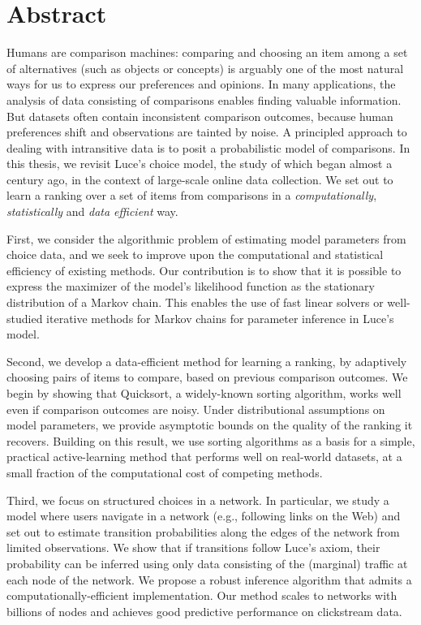 \cleardoublepage
\chapter*{Abstract}

Humans are comparison machines: comparing and choosing an item among a set of alternatives (such as objects or concepts) is arguably one of the most natural ways for us to express our preferences and opinions.
In many applications, the analysis of data consisting of comparisons enables finding valuable information.
But datasets often contain inconsistent comparison outcomes, because human preferences shift and observations are tainted by noise.
A principled approach to dealing with intransitive data is to posit a probabilistic model of comparisons.
In this thesis, we revisit Luce's choice model, the study of which began almost a century ago, in the context of large-scale online data collection.
We set out to learn a ranking over a set of items from comparisons in a \emph{computationally}, \emph{statistically} and \emph{data efficient} way.

First, we consider the algorithmic problem of estimating model parameters from choice data, and we seek to improve upon the computational and statistical efficiency of existing methods.
Our contribution is to show that it is possible to express the maximizer of the model's likelihood function as the stationary distribution of a Markov chain.
This enables the use of fast linear solvers or well-studied iterative methods for Markov chains for parameter inference in Luce's model.

Second, we develop a data-efficient method for learning a ranking, by adaptively choosing pairs of items to compare, based on previous comparison outcomes.
We begin by showing that Quicksort, a widely-known sorting algorithm, works well even if comparison outcomes are noisy.
Under distributional assumptions on model parameters, we provide asymptotic bounds on the quality of the ranking it recovers.
Building on this result, we use sorting algorithms as a basis for a simple, practical active-learning method that performs well on real-world datasets, at a small fraction of the computational cost of competing methods.

Third, we focus on structured choices in a network.
In particular, we study a model where users navigate in a network (e.g., following links on the Web) and set out to estimate transition probabilities along the edges of the network from limited observations.
We show that if transitions follow Luce's axiom, their probability can be inferred using only data consisting of the (marginal) traffic at each node of the network.
We propose a robust inference algorithm that admits a computationally-efficient implementation.
Our method scales to networks with billions of nodes and achieves good predictive performance on clickstream data.

